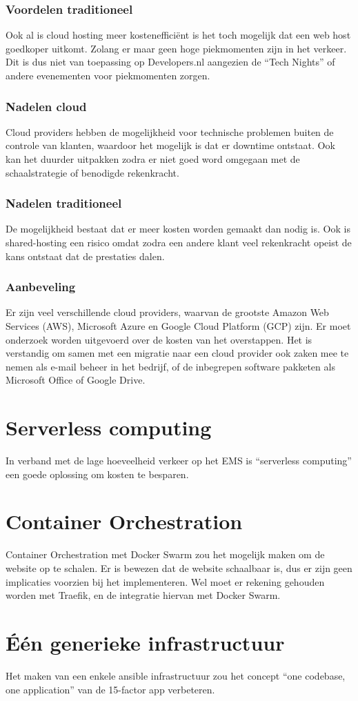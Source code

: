 \subsubsection{Voordelen traditioneel} 
Ook al is cloud hosting meer kostenefficiënt is het toch mogelijk dat een web host goedkoper uitkomt. Zolang er maar geen hoge piekmomenten zijn in het verkeer. Dit is dus niet van toepassing op Developers.nl aangezien de \enquote{Tech Nights} of andere evenementen voor piekmomenten zorgen. 

\subsubsection{Nadelen cloud}
Cloud providers hebben de mogelijkheid voor technische problemen buiten de controle van klanten, waardoor het mogelijk is dat er downtime ontstaat. Ook kan het duurder uitpakken zodra er niet goed word omgegaan met de schaalstrategie of benodigde rekenkracht.

\subsubsection{Nadelen traditioneel}
De mogelijkheid bestaat dat er meer kosten worden gemaakt dan nodig is. Ook is shared-hosting een risico omdat zodra een andere klant veel rekenkracht opeist de kans ontstaat dat de prestaties dalen.

\subsubsection{Aanbeveling}
Er zijn veel verschillende cloud providers, waarvan de grootste Amazon Web Services (AWS), Microsoft Azure en Google Cloud Platform (GCP) zijn. Er moet onderzoek worden uitgevoerd over de kosten van het overstappen. Het is verstandig om samen met een migratie naar een cloud provider ook zaken mee te nemen als e-mail beheer in het bedrijf, of de inbegrepen software pakketen als Microsoft Office of Google Drive.

\section{Serverless computing}
In verband met de lage hoeveelheid verkeer op het EMS is \enquote{serverless computing} een goede oplossing om kosten te besparen.

\section{Container Orchestration}
Container Orchestration met Docker Swarm zou het mogelijk maken om de website op te schalen. Er is bewezen dat de website schaalbaar is, dus er zijn geen implicaties voorzien bij het implementeren. Wel moet er rekening gehouden worden met Traefik, en de integratie hiervan met Docker Swarm.

\section{Één generieke infrastructuur}
Het maken van een enkele ansible infrastructuur zou het concept \enquote{one codebase, one application} van de 15-factor app verbeteren.